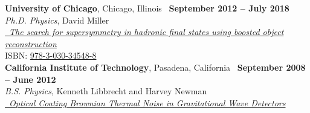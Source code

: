\documentclass[margin,line]{resume}
\begin{document}
\begin{resume}
\textbf{University of Chicago}, Chicago, Illinois \hfill \faCalendar\ \textbf{September 2012 -- July 2018}\\
\textsl{Ph.D. Physics}, David Miller\\
\href{https://kratsg.github.io/thesis/?utm_source=cv}{~\textsl{The search for supersymmetry in hadronic final states using boosted object reconstruction}}\\
ISBN: \href{https://books.google.com/books?vid=ISBN978-3-030-34548-8}{978-3-030-34548-8}\\[2.5mm]
%
\textbf{California Institute of Technology}, Pasadena, California \hfill \faCalendar\ \textbf{September 2008 -- June 2012}\\
\textsl{B.S. Physics}, Kenneth Libbrecht and Harvey Newman\\
\href{https://www.dropbox.com/s/h0mpop96cn563bq/Thesis.pdf?dl=0}{~\textsl{Optical Coating Brownian Thermal Noise in Gravitational Wave Detectors}}

\end{resume}
\end{document}

